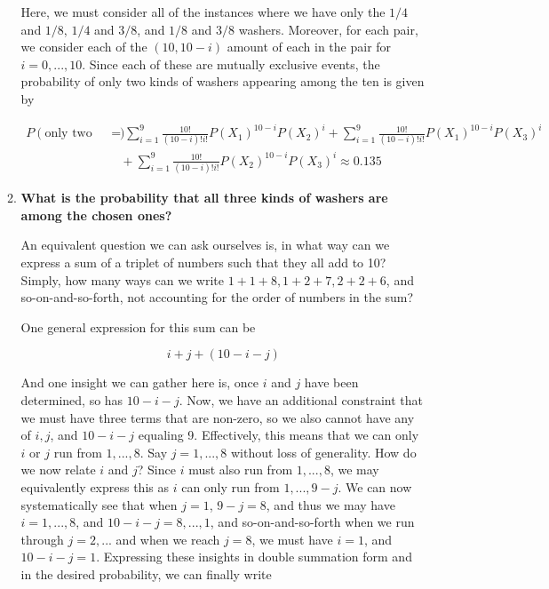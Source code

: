 \documentclass[10pt, oneside]{article}   	%
\theoremstyle{definition}
\begin{document}
\begin{enumerate}[label=8.\arabic*]
\begin{enumerate}
	Here, we must consider all of the instances where we have only the $1/4$ and $1/8$, $1/4$ and $3/8$, and $1/8$ and $3/8$ washers. Moreover, for each pair, we consider each of the $(10, 10-i)$ amount of each in the pair for $i = 0,..., 10$. Since each of these are mutually exclusive events, the probability of only two kinds of washers appearing among the ten is given by
	
	\begin{align*}
	P(\text{only two kinds of washers}) &= \sum^9_{i=1} \frac{10!}{(10-i)! i!} P(X_1)^{10-i} P(X_2)^i + \sum^9_{i=1} \frac{10!}{(10-i)! i!} P(X_1)^{10-i} P(X_3)^i \\
	&\quad +  \sum^9_{i=1} \frac{10!}{(10-i)! i!} P(X_2)^{10-i} P(X_3)^i \approx \boxed{0.135}
	\end{align*}
	
	\item  \begin{tcolorbox}[
	  colback=Cerulean!5!white,
	  colframe=Cerulean!75!black]
	\textbf{What is the probability that all three kinds of washers are among the chosen ones?}
	\end{tcolorbox}
	
	An equivalent question we can ask ourselves is, in what way can we express a sum of a triplet of numbers such that they all add to 10? Simply, how many ways can we write $1+1+8, 1+2+7, 2+2+6$, and so-on-and-so-forth, not accounting for the order of numbers in the sum?
	
	One general expression for this sum can be
	
	\[ i + j + (10 - i - j) \] 
	
	And one insight we can gather here is, once $i$ and $j$ have been determined, so has $10 - i - j$. Now, we have an additional constraint that we must have three terms that are non-zero, so we also cannot have any of $i, j$, and $10 - i - j$ equaling 9. Effectively, this means that we can only $i$ or $j$ run from $1, ..., 8$. Say $j = 1,...,8$ without loss of generality. How do we now relate $i$ and $j$? Since $i$ must also run from $1, ..., 8$, we may equivalently express this as $i$ can only run from $1,..., 9-j$. We can now systematically see that when $j = 1$, $9-j = 8$, and thus we may have $i = 1,..., 8$, and $10-i-j = 8, ..., 1$, and so-on-and-so-forth when we run through $j = 2, ...$ and when we reach $j = 8$, we must have $i = 1$, and $10 - i - j = 1$. Expressing these insights in double summation form and in the desired probability, we can finally write
	

\end{enumerate}
\end{enumerate}
\end{document}
